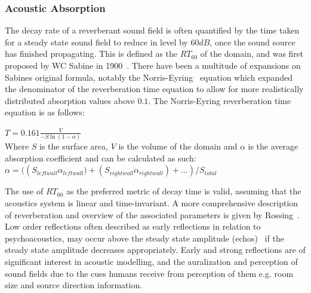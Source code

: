 \subsubsection{Acoustic Absorption}
The decay rate of a reverberant sound field is often quantified by the time taken for a steady state sound field to reduce in level by $60{dB}$, once the sound source has finished propagating. This is defined as the $RT_{60}$ of the domain, and was first proposed by WC Sabine in 1900~\cite{Everest2009}. There have been a multitude of expansions on Sabines original formula, notably the Norris-Eyring~\cite{Beranek2006} equation which expanded the denominator of the reverberation time equation to allow for more realistically distributed absorption values above $0.1$. The Norris-Eyring reverberation time equation is as follows:\\
\begin{center}
$T = 0.161\frac{V}{-S \ln(1 - \alpha)} $\\
Where $S$ is the surface area, $V$ is the volume of the domain and $\alpha$ is the average absorption coefficient and can be calculated as such:\\
$\alpha = (\left( S_{leftwall} \alpha_{leftwall})+(S_{rightwall} \alpha_{rightwall})+... \right) /S_{total}$ \\
\end{center}
The use of $RT_{60}$ as the preferred metric of decay time is valid, assuming that the acoustics system is linear and time-invariant.
A more comprehensive description of reverberation and overview of the associated parameters is given by Rossing~\cite{rossing2007springer}. \\

Low order reflections often described as early reflections in relation to psychoacoustics, may occur above the steady state amplitude (echos)~\cite{Everest2009} if the steady state amplitude decreases appropriately. Early and strong reflections are of significant interest in acoustic modelling, and the auralization and perception of sound fields due to the cues humans receive from perception of them e.g. room size and source direction information.\\

